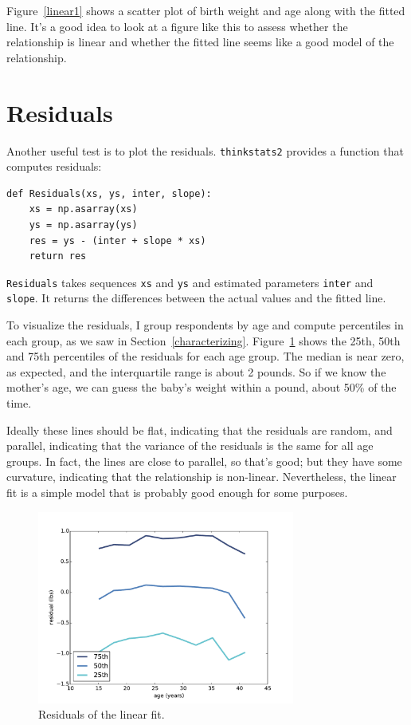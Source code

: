 \documentclass[12pt]{book}
\begin{document}
Figure~\ref{linear1} shows a scatter plot of birth weight and age
along with the fitted line.  It's a good idea to look at a figure like
this to assess whether the relationship is linear and whether the
fitted line seems like a good model of the relationship.


\section{Residuals}

Another useful test is to plot the residuals.
{\tt thinkstats2} provides a function that computes residuals:

\begin{verbatim}
def Residuals(xs, ys, inter, slope):
    xs = np.asarray(xs)
    ys = np.asarray(ys)
    res = ys - (inter + slope * xs)
    return res
\end{verbatim}

{\tt Residuals} takes sequences {\tt xs} and {\tt ys} and
estimated parameters {\tt inter} and {\tt slope}.  It returns
the differences between the actual values and the fitted line.

To visualize the residuals, I group respondents by age and compute
percentiles in each group, as we saw in Section~\ref{characterizing}.
Figure~\ref{linear2} shows the 25th, 50th and 75th percentiles of
the residuals for each age group.  The median is near zero, as
expected, and the interquartile range is about 2 pounds.  So if we
know the mother's age, we can guess the baby's weight within a pound,
about 50\% of the time.

Ideally these lines should be flat, indicating that the residuals are
random, and parallel, indicating that the variance of the residuals is
the same for all age groups.  In fact, the lines are close to
parallel, so that's good; but they have some curvature, indicating
that the relationship is non-linear.  Nevertheless, the linear fit
is a simple model that is probably good enough for some purposes.

\begin{figure}
\centerline{\includegraphics[height=2.5in]{figs/linear2.pdf}}
\caption{Residuals of the linear fit.}
\label{linear2}
\end{figure}
\end{document}

